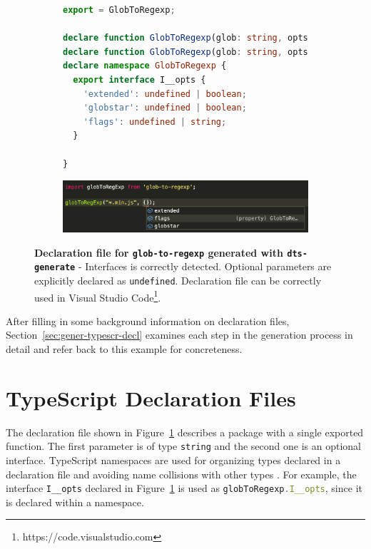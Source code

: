 \documentclass[english,cleveref,autoref,submission]{programming}
\newcommand{\figref}[1]{Figure~\ref{#1}}
\begin{document}
\begin{figure}[tp]
  \centering
  \begin{subfigure}{0.70\linewidth}
    \begin{lstlisting}[language=TypeScript]
export = GlobToRegexp;

declare function GlobToRegexp(glob: string, opts: undefined): RegExp;
declare function GlobToRegexp(glob: string, opts: GlobToRegexp.I__opts): RegExp;
declare namespace GlobToRegexp {
  export interface I__opts {
    'extended': undefined | boolean;
    'globstar': undefined | boolean;
    'flags': undefined | string;
  }

}
    \end{lstlisting}
  \end{subfigure}

  \hspace{10.\textwidth}

  \begin{subfigure}{1.\linewidth}
    \centering
    \includegraphics[width=0.8\linewidth]{motivating-example-glob-to-regexp-vscode.png}
  \end{subfigure}

  \caption{\textbf{Declaration file for \texttt{glob-to-regexp} generated with \texttt{dts-generate}} - Interfaces is correctly detected. Optional parameters are explicitly declared as \texttt{undefined}. Declaration file can be correctly used in Visual Studio Code\footnote{https://code.visualstudio.com}.}
  \label{fig:motivating-example-glob-to-regexp-vscode}
\end{figure}

After filling in some background information on declaration files,
Section~\ref{sec:gener-typescr-decl} examines each step in the
generation process in detail and refer back to this example for
concreteness.

\section{TypeScript Declaration Files}
\label{sec:typescr-decl-files}

The declaration file shown in
\figref{fig:motivating-example-glob-to-regexp-vscode} describes a
package with a single exported function. The first parameter is of type \texttt{string} and the second one is an optional interface. TypeScript namespaces are used for organizing types declared in a declaration file and avoiding name collisions with other types \cite{typescript-namespaces}. For example, the interface \texttt{I\_\_opts} declared in \figref{fig:motivating-example-glob-to-regexp-vscode} is used as \lstinline[language=TypeScript]{globToRegexp.I__opts}, since it is declared within a namespace.
\end{document}

